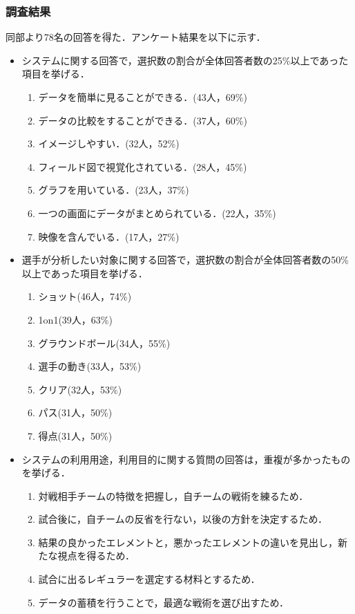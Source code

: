 \documentclass[sotsuron]{kuee}
\begin{document}
			\subsubsection{調査結果}
				同部より78名の回答を得た．アンケート結果を以下に示す．
				\begin{itemize}
				\item システムに関する回答で，選択数の割合が全体回答者数の25\%以上であった項目を挙げる．
					\begin{enumerate}
					\item データを簡単に見ることができる．(43人，69\%)
					\item データの比較をすることができる．(37人，60\%)
					\item イメージしやすい．(32人，52\%)
					\item フィールド図で視覚化されている．(28人，45\%)
					\item グラフを用いている．(23人，37\%)
					\item 一つの画面にデータがまとめられている．(22人，35\%)
					\item 映像を含んでいる．(17人，27\%)
					\end{enumerate}
				\item 選手が分析したい対象に関する回答で，選択数の割合が全体回答者数の50\%以上であった項目を挙げる．
					\begin{enumerate}
					\item ショット(46人，74\%)
					\item 1on1(39人，63\%)
					\item グラウンドボール(34人，55\%)
					\item 選手の動き(33人，53\%)
					\item クリア(32人，53\%)
					\item パス(31人，50\%)
					\item 得点(31人，50\%)
					\end{enumerate}
				\item システムの利用用途，利用目的に関する質問の回答は，重複が多かったものを挙げる．
					\begin{enumerate}
					\item 対戦相手チームの特徴を把握し，自チームの戦術を練るため．
					\item 試合後に，自チームの反省を行ない，以後の方針を決定するため．
					\item 結果の良かったエレメントと，悪かったエレメントの違いを見出し，新たな視点を得るため．
					\item 試合に出るレギュラーを選定する材料とするため．
					\item データの蓄積を行うことで，最適な戦術を選び出すため．
					\end{enumerate}
				\end{itemize}
\end{document}
